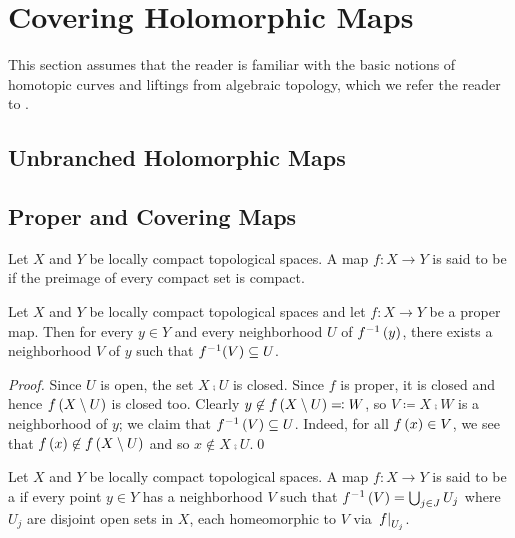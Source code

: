 \documentclass[../Moduli_Spaces_of_Riemann_Surfaces.tex]{subfiles}
\begin{document}
    \section{Covering Holomorphic Maps}
    This section assumes that the reader is familiar with the basic notions of homotopic curves and liftings from algebraic topology, which we refer the reader to \cite[][Sections 4.7 $-$ 4.10]{otto}.
    \subsection{Unbranched Holomorphic Maps}
    \subsection{Proper and Covering Maps}
    \begin{definition}
        Let $X$ and $Y$ be locally compact topological spaces. A map $f:X\to Y$ is said to be  if the preimage of every compact set is compact.
    \end{definition}
    \begin{lemma}\label{1.3:lem:lemma_for_proper_covering}
        Let $X$ and $Y$ be locally compact topological spaces and let $f:X\to Y$ be a proper map. Then for every $y\in Y$ and every neighborhood $U$ of $f^{-1}\left(y\right)$, there exists a neighborhood $V$ of $y$ such that $f^{-1}\!\left(V\right)\subseteq U$.
    \end{lemma}
    \begin{proof}
        Since $U$ is open, the set $X\comp U$ is closed. Since $f$ is proper, it is closed and hence $f\left(X\setminus U\right)$ is closed too. Clearly $y\not\in f\left(X\setminus U\right)\eqqcolon W$, so $V\coloneqq X\comp W$ is a neighborhood of $y$; we claim that $f^{-1}\left(V\right)\subseteq U$. Indeed, for all $f\left(x\right)\in V$, we see that $f\left(x\right)\not\in f\left(X\setminus U\right)$ and so $x\not\in X\comp U$.\qed
    \end{proof}
    \begin{definition}
        Let $X$ and $Y$ be locally compact topological spaces. A map $f:X\to Y$ is said to be a  if every point $y\in Y$ has a neighborhood $V$ such that $f^{-1}\left(V\right)=\bigcup_{j\in J}U_j$ where $U_j$ are disjoint open sets in $X$, each homeomorphic to $V$ via $\left.f\right|_{U_j}$.
    \end{definition}
\end{document}
